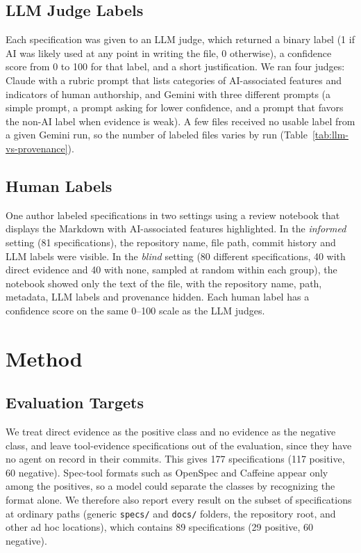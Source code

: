 \documentclass{article}
\begin{document}
\subsection{LLM Judge Labels}
Each specification was given to an LLM judge, which returned a binary label (1 if AI was likely used at any point in writing the file, 0 otherwise), a confidence score from 0 to 100 for that label, and a short justification. We ran four judges: Claude with a rubric prompt that lists categories of AI-associated features and indicators of human authorship, and Gemini with three different prompts (a simple prompt, a prompt asking for lower confidence, and a prompt that favors the non-AI label when evidence is weak). A few files received no usable label from a given Gemini run, so the number of labeled files varies by run (Table~\ref{tab:llm-vs-provenance}).

\subsection{Human Labels}
One author labeled specifications in two settings using a review notebook that displays the Markdown with AI-associated features highlighted. In the \emph{informed} setting (81 specifications), the repository name, file path, commit history and LLM labels were visible. In the \emph{blind} setting (80 different specifications, 40 with direct evidence and 40 with none, sampled at random within each group), the notebook showed only the text of the file, with the repository name, path, metadata, LLM labels and provenance hidden. Each human label has a confidence score on the same 0--100 scale as the LLM judges.

\section{Method}
\subsection{Evaluation Targets}
We treat direct evidence as the positive class and no evidence as the negative class, and leave tool-evidence specifications out of the evaluation, since they have no agent on record in their commits. This gives 177 specifications (117 positive, 60 negative). Spec-tool formats such as OpenSpec and Caffeine appear only among the positives, so a model could separate the classes by recognizing the format alone. We therefore also report every result on the subset of specifications at ordinary paths (generic \texttt{specs/} and \texttt{docs/} folders, the repository root, and other ad hoc locations), which contains 89 specifications (29 positive, 60 negative).
\end{document}
